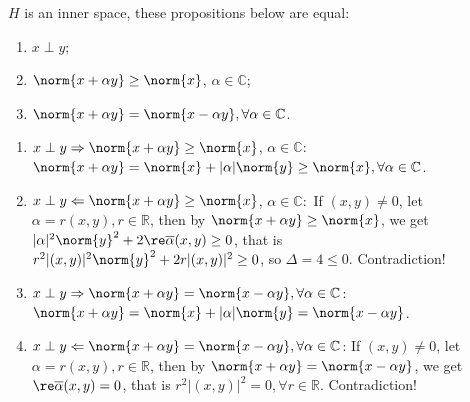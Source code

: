 \documentclass{ctexart}
\begin{document}
\begin{problem}
    $H$ is an inner space, these propositions below are equal:
    \begin{enumerate}
        \item $x\perp y$;
        \item $\norm{x+\alpha y}\geq \norm{x}$, $\alpha\in \mathbb{C}$;
        \item $\norm{x+\alpha y}=\norm{x-\alpha y},\forall \alpha\in \mathbb{C}$.
    \end{enumerate}
\end{problem}
\begin{solution}
    \begin{enumerate}
        \item $x\perp y \Rightarrow \norm{x+\alpha y}\geq \norm{x}$, $\alpha\in \mathbb{C}:$ $\norm{x+\alpha y}=\norm{x}+|\alpha|\norm{y}\geq \norm{x},\forall \alpha\in \mathbb{C}$.
        \item $x\perp y \Leftarrow \norm{x+\alpha y}\geq \norm{x}$, $\alpha\in \mathbb{C}:$ If $(x,y)\neq 0$, let $\alpha=r(x,y),r\in \mathbb{R}$, then by $\norm{x+\alpha y}\geq \norm{x}$, we get $|\alpha|^2\norm{y}^2+2\re\overline{\alpha}(x,y)\geq 0$, that is $r^2|(x,y)|^2\norm{y}^2+2r|(x,y)|^2\geq 0$, so $\Delta=4\leq 0$. Contradiction!
        \item $x\perp y \Rightarrow \norm{x+\alpha y}=\norm{x-\alpha y},\forall \alpha\in \mathbb{C}$: $\norm{x+\alpha y}=\norm{x}+|\alpha|\norm{y}=\norm{x-\alpha y}$.
        \item $x\perp y \Leftarrow \norm{x+\alpha y}=\norm{x-\alpha y},\forall \alpha\in \mathbb{C}$: If $(x,y)\neq 0$, let $\alpha=r(x,y),r\in \mathbb{R}$, then by $\norm{x+\alpha y}= \norm{x-\alpha y}$, we get $\re\overline{\alpha}(x,y)=0$, that is $r^2|(x,y)|^2= 0,\forall r\in \mathbb{R}$. Contradiction!
    \end{enumerate}
\end{solution}
\end{document}
